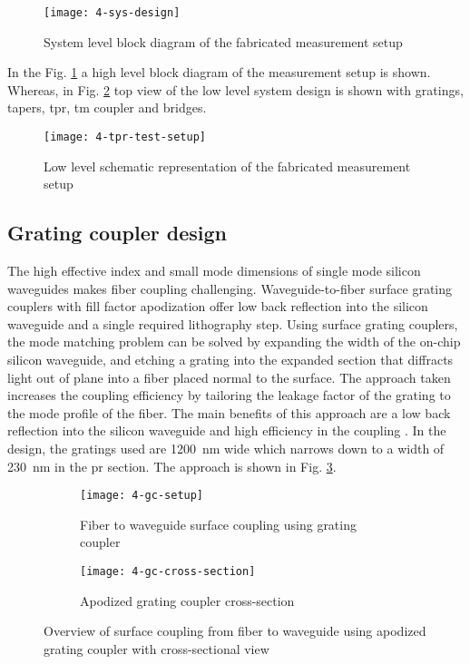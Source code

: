 \documentclass[../report.tex]{subfiles}
\begin{document}
\begin{figure}[H] %
	\centering
	\texttt{[image: 4-sys-design]}
	\caption{System level block diagram of the fabricated measurement setup}
	\label{fig:4_sys_design}
\end{figure}
\noindent In the Fig. \ref{fig:4_sys_design} a high level block diagram of the measurement setup is shown. Whereas, in Fig. \ref{fig:4_tpr_test_setup} top view of the low level system design is shown with gratings, tapers, \gls{tpr}, \gls{tm} coupler and bridges. 
\begin{figure}[H] %
	\centering
	\texttt{[image: 4-tpr-test-setup]}
	\caption{Low level schematic representation of the fabricated measurement setup}
	\label{fig:4_tpr_test_setup}
\end{figure}

\subsection{Grating coupler design}
The high effective index and small mode dimensions of single mode silicon waveguides makes fiber coupling challenging. Waveguide-to-fiber surface grating couplers with fill factor apodization offer low back reflection into the silicon waveguide and a single required lithography step. Using surface grating couplers, the mode matching problem can be solved by expanding the width of the on-chip silicon waveguide, and etching a grating into the expanded section that diffracts light out of plane into a fiber placed normal to the surface. The approach taken increases the coupling efficiency by tailoring the leakage factor of the grating to the mode profile of the fiber. The main benefits of this approach are a low back reflection into the silicon waveguide and high efficiency in the coupling \cite{grating_coupler}. In the design, the gratings used are \SI{1200}{\nano\meter} wide which narrows down to a width of \SI{230}{\nano\meter} in the \gls{pr} section. The approach is shown in Fig. \ref{fig:4_gc_setup}.

\begin{figure}[H] %
	\begin{subfigure}[t]{0.45\textwidth}
		\texttt{[image: 4-gc-setup]}
		\caption{Fiber to waveguide surface coupling using grating coupler}
		\label{fig:4_gc_setup}
	\end{subfigure}
	\hfill
	\begin{subfigure}[t]{0.45\textwidth}
		\texttt{[image: 4-gc-cross-section]}
		\caption{Apodized grating coupler cross-section}
		\label{fig:4_gc_cross_section}
	\end{subfigure}
	\caption{Overview of surface coupling from fiber to waveguide using apodized grating coupler with cross-sectional view}
\end{figure}
\end{document}
